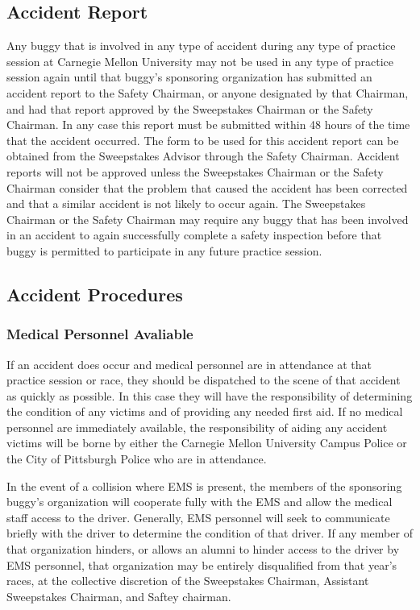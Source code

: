	
\subsection{Accident Report}

	Any buggy that is involved in any type of accident during any type of practice
	session at Carnegie Mellon University may not be used in any type of practice
	session again until that buggy's sponsoring organization has submitted an
	accident report to the Safety Chairman, or anyone designated by that Chairman,
	and had that report approved by the Sweepstakes Chairman or the Safety
	Chairman. In any case this report must be submitted within 48 hours of the time
	that the accident occurred. The form to be used for this accident report can be
	obtained from the Sweepstakes Advisor through the Safety Chairman. Accident
	reports will not be approved unless the Sweepstakes Chairman or the Safety
	Chairman consider that the problem that caused the accident has been corrected
	and that a similar accident is not likely to occur again. The Sweepstakes
	Chairman or the Safety Chairman may require any buggy that has been involved in
	an accident to again successfully complete a safety inspection before that
	buggy is permitted to participate in any future practice session.

\subsection{Accident Procedures}
	
	\subsubsection{Medical Personnel Avaliable}
	If an accident does occur and medical personnel are in attendance at that 
	practice session or race, they
	should be dispatched to the scene of that accident as quickly as possible. In
	this case they will have the responsibility of determining the condition of any
	victims and of providing any needed first aid. If no medical personnel are
	immediately available, the responsibility of aiding any accident victims will
	be borne by either the Carnegie Mellon University Campus Police or the City of
	Pittsburgh Police who are in attendance.
	
	In the event of a collision where EMS is present, the members of the
	sponsoring buggy's organization will cooperate fully with the EMS and allow
	the medical staff access to the driver. Generally, EMS personnel will seek
	to communicate briefly with the driver to determine the condition of that
	driver. If any member of that organization hinders, or allows an alumni to
	hinder access to the driver by EMS personnel, that organization may be
	entirely disqualified from that year's races, at the collective discretion
	of the Sweepstakes Chairman, Assistant Sweepstakes Chairman, and Saftey
	chairman.

